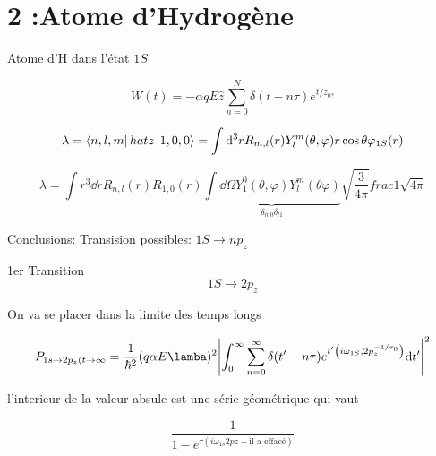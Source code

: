 

\section*{2 :Atome d'Hydrogène}


Atome d'H dans l'état $1S$ 

$$W(t) = -\alpha q E \hat z \sum_{n=0}^{N} \delta (t-n\tau) e^{t/z_{0?} }$$ 

$$\lambda = \bra{n,l,m} hat z \ket{1,0,0} = \int \dd^3 r R_{m,l} (r) Y_l^{m} (\theta, \varphi) r \cos\theta \varphi_{1S} (r) $$ 

$$\lambda = \int r^3 \dd r R_{n,l} (r) R_{1,0} (r) \underbrace{\int\dd \Omega Y_1^{0} (\theta, \varphi) Y_l^{m}(\theta \varphi)}_{\delta_{m0} \delta_{l1} }  \sqrt{\frac{3}{4\pi} } frac 1 \sqrt{4\pi}$$ 

\underline{Conclusions}:
Transision possibles: $1S \to n p_z$ 

1er Transition $$1S \to 2p_z$$ 


On va se placer dans la limite des temps longs

$$P_{1s\to2p_{z}(t\to \infty} = \frac{1}{\hbar^2} (q\alpha E \lamba)^2 \abs{\int_0^{\infty}\sum_{n=0}^{\infty} \delta (t'-n\tau) e^{t'\left( i\omega_{1S}, 2p_z^{-1/\tau_{0}}  \right) }\dd t'}^{2}$$ 

l'interieur de la valeur absule est une série géométrique qui vaut

$$ \frac{1}{1-e^{\tau \left( i\omega_{1s} 2pz - \text{il a effacé}  \right) }}$$ 


$$$$ 


